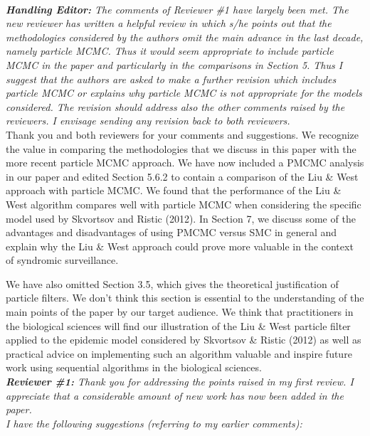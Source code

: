 \documentclass{article}
\begin{document}
 \\

\noindent \emph{{\bf Handling Editor:} The comments of Reviewer \#1 have largely been met.  The new reviewer has written a helpful review in which s/he points out that the methodologies considered by the authors omit the main advance in the last decade, namely particle MCMC.  Thus it would seem appropriate to include particle MCMC in the paper and particularly in the comparisons in Section 5.  Thus I suggest that the authors are asked to make a further revision which includes particle MCMC or explains why particle MCMC is not appropriate for the models considered.  The revision should address also the other comments raised by the reviewers.  I envisage sending any revision back to both reviewers.} \\

Thank you and both reviewers for your comments and suggestions. We recognize the value in comparing the methodologies that we discuss in this paper with the more recent particle MCMC approach. We have now included a PMCMC analysis in our paper and edited Section 5.6.2 to contain a comparison of the Liu \& West approach with particle MCMC. We found that the performance of the Liu \& West algorithm compares well with particle MCMC when considering the specific model used by Skvortsov and Ristic (2012). In Section 7, we discuss some of the advantages and disadvantages of using PMCMC versus SMC in general and explain why the Liu \& West approach could prove more valuable in the context of syndromic surveillance.

We have also omitted Section 3.5, which gives the theoretical justification of particle filters. We don't think this section is essential to the understanding of the main points of the paper by our target audience. We think that practitioners in the biological sciences will find our illustration of the Liu \& West particle filter applied to the epidemic model considered by Skvortsov \& Ristic (2012) as well as practical advice on implementing such an algorithm valuable and inspire future work using sequential algorithms in the biological sciences. \\

\noindent \emph{{\bf Reviewer \#1:} Thank you for addressing the points raised in my first review. I appreciate that a considerable amount of new work has now been added in the paper.} \\

\noindent \emph{I have the following suggestions (referring to my earlier comments):} \\
\end{document}
